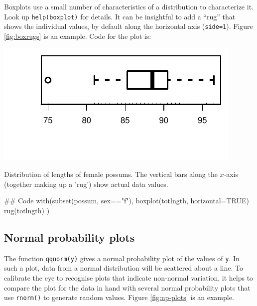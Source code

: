 \documentclass{tufte-book}\usepackage[]{graphicx}\usepackage[]{color}
\newcommand{\txtt}[1]{\texttt{#1}}
\begin{document}
Boxplots use a small number of characteristics of a distribution to
characterize it. Look up \txtt{help(boxplot)} for details.
It can be insightful to add a ``rug'' that shows the individual values,
by default along the horizontal axis (\txtt{side=1}).
Figure \ref{fig:boxrugs} is an example.  Code for the plot is:
\begin{marginfigure}
\begin{Schunk}


\centerline{\includegraphics[width=\textwidth]{figs/07-boxplot-1} }

\end{Schunk}
\vspace*{-12pt}

\caption{Distribution of lengths of female possums.  The 
 vertical bars along the $x$-axis (together making up a 'rug')
 show actual data values.\label{fig:boxrugs}}
\end{marginfigure}

\begin{Schunk}
\begin{Sinput}
## Code
with(subset(possum, sex=="f"),
     {boxplot(totlngth, horizontal=TRUE)
      rug(totlngth)} )
\end{Sinput}
\end{Schunk}

\subsection*{Normal probability plots}

The function \txtt{qqnorm(y)} gives a normal probability plot of the
values of \txtt{y}. In such a plot, data from a normal distribution
will be scattered about a line.  To calibrate the eye to recognise
plots that indicate non-normal variation, it helps to compare the plot
for the data in hand with several normal probability plots that use
\txtt{rnorm()} to generate random values.  Figure \ref{fig:np-plots}
is an example.
\end{document}
